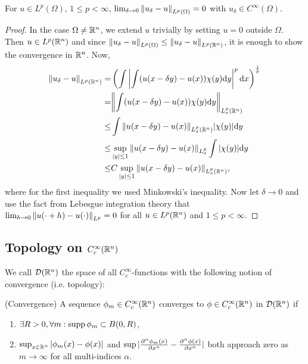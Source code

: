 \documentclass[11pt]{article}
\begin{document}
			\begin{lemma}
				For $u\in L^p(\Omega)$, $1\le p<\infty$, $\lim_{\delta\to 0}\norm{u_\delta-u}_{L^p(\Omega)}=0$ with $u_\delta\in C^\infty(\Omega)$.
			\end{lemma}
			\begin{proof}
				In the case $\Omega\neq\R^n$, we extend $u$ trivially by setting $u=0$ outside $\Omega$. Then $u\in L^p(\R^n)$ and since $\norm{u_\delta-u}_{L^p(\Omega)}\le\norm{u_\delta-u}_{L^p(\R^n)}$, it is enough to show the convergence in $\R^n$. Now,
				\begin{align*}
					\norm{u_\delta-u}_{L^p(\R^n)}=&\left(\int\left|\int(u(x-\delta y)-u(x))\chi(y)\mathrm{d}y\right|^p \mathrm{d}x\right)^{\frac{1}{p}}\\
					=&\norm{\int(u(x-\delta y)-u(x))\chi(y)\mathrm{d}y}_{L^p_x(\R^n)}\\
					\le&\int\norm{u(x-\delta y)-u(x)}_{L^p_x(\R^n)}|\chi(y)|\mathrm{d}y\\
					\le&\sup_{|y|\le 1}\norm{u(x-\delta y)-u(x)}_{L^p_x}\int|\chi(y)|\mathrm{d}y\\
					\le& C\sup_{|y|\le1}\norm{u(x-\delta y)-u(x)}_{L^p_x(\R^n)},
				\end{align*}
				where for the first inequality we used Minkowski's inequality.
				Now let $\delta\to 0$ and use the fact from Lebesgue integration theory that $\lim_{h\to0}\norm{u(\cdot+h)-u(\cdot)}_{L^p}=0$ for all $u\in L^p(\R^n)$ and $1\le p<\infty$.
			\end{proof}


		\subsection{Topology on $C^\infty_c(\R^n)$}

			We call $\D(\R^n)$ the space of all $C^\infty_c$-functions with the following notion of convergence (i.e. topology):

			\begin{defi}\label{def--convergence}
				(Convergence) A sequence $\phi_m\in C^\infty_c(\R^n)$ converges to $\phi\in C^\infty_c(\R^n)$ in $\D(\R^n)$ if
				\begin{enumerate}
					\item $\exists R>0,\forall m:\supp\phi_m\subset B(0,R)$,
					\item $\sup_{x\in\R^n}|\phi_m(x)-\phi(x)|$ and $\sup|\del[\alpha]{\phi_m(x)}{x^\alpha}-\del[\alpha]{\phi(x)}{x^\alpha}|$ both approach zero as $m\to\infty$ for all multi-indices $\alpha$.
				\end{enumerate}
			\end{defi}
\end{document}
